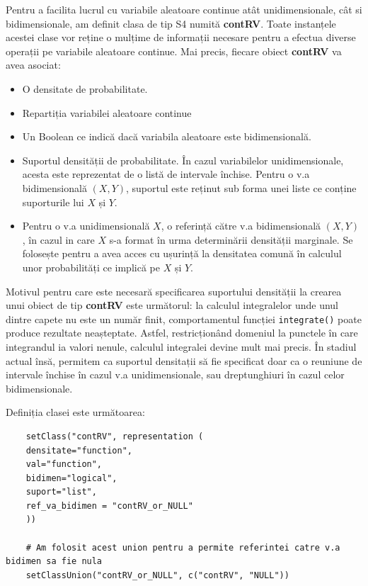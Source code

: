 \documentclass[12pt]{article}
\begin{document}
Pentru a facilita lucrul cu variabile aleatoare continue atât unidimensionale, cât si bidimensionale, am definit clasa de tip S4 numită \textbf{contRV}. Toate instanțele acestei clase vor reține o mulțime de informații necesare pentru a efectua diverse operații pe variabile aleatoare continue. Mai precis, fiecare obiect \textbf{contRV} va avea 
asociat:
\begin{itemize}
	\item O densitate de probabilitate.
	\item Repartiția variabilei aleatoare continue
	\item Un Boolean ce indică dacă variabila aleatoare este bidimensională.
	\item Suportul densității de probabilitate. În cazul variabilelor unidimensionale, acesta este reprezentat de o listă de intervale închise. Pentru o v.a bidimensională $(X, Y)$, suportul este reținut sub forma unei liste ce conține suporturile lui $X$ și $Y$.
	\item Pentru o v.a unidimensională $X$, o referință către v.a bidimensională $(X, Y)$, în cazul in care $X$ s-a format în urma determinării densității marginale. Se folosește pentru a avea acces cu ușurință la densitatea comună în calculul unor probabilități ce implică pe $X$ și $Y$. 
\end{itemize}\vspace*{1\baselineskip} \par
Motivul pentru care este necesară specificarea suportului densității la crearea unui obiect de tip \textbf{contRV} este următorul: la calculul integralelor unde unul dintre capete nu este un număr finit, comportamentul funcției \lstinline|integrate()| poate produce rezultate neașteptate. Astfel, restricționând domeniul la punctele în care integrandul ia valori nenule, calculul integralei devine mult mai precis.
În stadiul actual însă, permitem ca suportul densitații să fie specificat doar ca o reuniune de intervale închise în cazul v.a unidimensionale, sau dreptunghiuri în cazul celor bidimensionale.\vspace*{1\baselineskip}\par

Definiția clasei este următoarea:
\begin{lstlisting}
	setClass("contRV", representation (
	densitate="function",
	val="function",
	bidimen="logical",
	suport="list",
	ref_va_bidimen = "contRV_or_NULL"
	))
	
	# Am folosit acest union pentru a permite referintei catre v.a bidimen sa fie nula
	setClassUnion("contRV_or_NULL", c("contRV", "NULL"))
\end{lstlisting}\pagebreak
\end{document}
